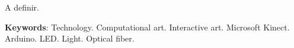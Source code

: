 
\begin{ABSTRACT}
	\begin{SingleSpace}
	
		\hspace{-1.3 cm}A definir.

		\vspace*{0.5cm}\hspace{-1.3 cm}\textbf{Keywords}: Technology. Computational art. Interactive art. Microsoft Kinect. Arduino. LED. Light. Optical fiber.
		
		
	\end{SingleSpace}

\end{ABSTRACT}

